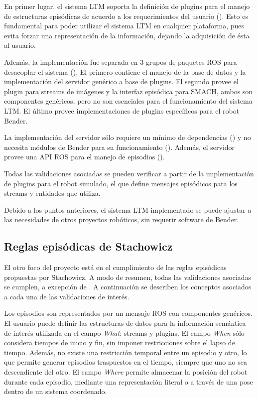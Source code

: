 En primer lugar, el sistema LTM soporta la definición de plugins para el manejo de estructuras episódicas de acuerdo a los requerimientos del usuario (). Esto es fundamental para poder utilizar el sistema LTM en cualquier plataforma, pues evita forzar una representación de la información, dejando la adquisición de ésta al usuario.

Además, la implementación fue separada en 3 grupos de paquetes ROS para desacoplar el sistema (). El primero contiene el manejo de la base de datos y la implementación del servidor genérico a base de plugins. El segundo provee el plugin para streams de imágenes y la interfaz episódica para SMACH, ambos son componentes genéricos, pero no son esenciales para el funcionamiento del sistema LTM. El último provee implementaciones de plugins específicos para el robot Bender.

La implementación del servidor sólo requiere un mínimo de dependencias () y no necesita módulos de Bender para su funcionamiento (). Además, el servidor provee una API ROS para el manejo de episodios ().

Todas las validaciones asociadas se pueden verificar a partir de la implementación de plugins para el robot simulado, el que define mensajes episódicos para los streams y entidades que utiliza.

Debido a los puntos anteriores, el sistema LTM implementado se puede ajustar a las necesidades de otros proyectos robóticos, sin requerir software de Bender.


\subsection{Reglas episódicas de Stachowicz}

El otro foco del proyecto está en el cumplimiento de las reglas episódicas propuestas por Stachowicz. A modo de resumen, todas las validaciones asociadas se cumplen, a excepción de . A continuación se describen los conceptos asociados a cada una de las validaciones de interés.

Los episodios son representados por un mensaje ROS con componentes genéricos. El usuario puede definir las estructuras de datos para la información semántica de interés utilizada en el campo \textit{What}: streams y plugins. El campo \textit{When} sólo considera tiempos de inicio y fin, sin imponer restricciones sobre el lapso de tiempo. Además, no existe una restricción temporal entre un episodio y otro, lo que permite generar episodios traspuestos en el tiempo, siempre que uno no sea descendiente del otro. El campo \textit{Where} permite almacenar la posición del robot durante cada episodio, mediante una representación literal o a través de una pose dentro de un sistema coordenado.

